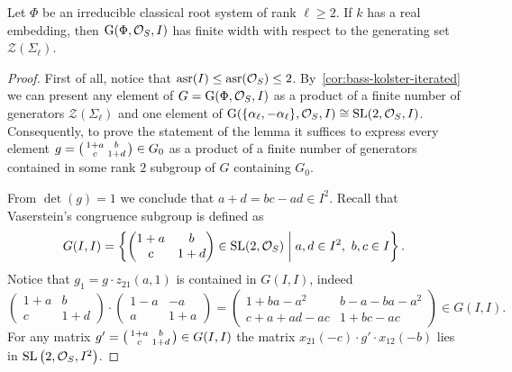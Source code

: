 \begin{lemma}\label{lemma:width-dedekind}
Let $\Phi$ be an irreducible classical root system of rank $\ell \geqslant 2$.
If $k$ has a real embedding, then $\operatorname{G}(\Phi,\mathcal{O}_S,I)$ has finite width with respect to the generating set $\mathcal{Z}(\Sigma_\ell)$.
\end{lemma}
\begin{proof}
First of all, notice that $\operatorname{asr}(I) \leq \operatorname{asr}(\mathcal{O}_S) \leq 2$. 
By~\cref{cor:bass-kolster-iterated} we can present any element 
of $G=\operatorname{G}(\Phi, \mathcal{O}_S, I)$ as a product of a finite number of generators $\mathcal{Z}(\Sigma_\ell)$ and one element of 
$\operatorname{G}(\{\alpha_\ell, -\alpha_\ell\}, \mathcal{O}_S, I)\cong\operatorname{SL}(2,\mathcal{O}_S,I)$.
Consequently, to prove the statement of the lemma it suffices to express every element 
$g = \begin{psmallmatrix}1+a & b \\ c & 1+d \end{psmallmatrix} \in G_0$
as a product of a finite number of generators contained in some rank $2$ subgroup of $G$ containing $G_0$.

From $\det(g)=1$ we conclude that $a+d=bc-ad\in I^2$. 
Recall that Vaserstein's congruence subgroup is defined as
\[ G(I,I)=\left\{ \begin{pmatrix}1+a & b \\ c & 1+d\end{pmatrix}\in\SL(2,\mathcal{O}_S)\;\middle|\; a,d\in I^2,\ b,c\in I \right\}. \]
Notice that $g_1=g\cdot z_{21}(a,1)$ is contained in $G(I,I)$, indeed
\[ \begin{pmatrix} 1+a & b \\ c & 1+d \end{pmatrix} \cdot \begin{pmatrix} 1-a & -a \\ a & 1+a \end{pmatrix} = \begin{pmatrix} 1+ba-a^2 & b-a-ba-a^2 \\ c+a+ad-ac & 1+bc-ac \end{pmatrix} \in G(I,I). \]
For any matrix $g'=\begin{psmallmatrix}1+a & b \\ c & 1+d\end{psmallmatrix}\in G(I,I)$ the matrix $x_{21}(-c)\cdot g'\cdot x_{12}(-b)$ lies in $\operatorname{SL}\left(2,\mathcal{O}_S,I^2\right)$.


\end{proof}
